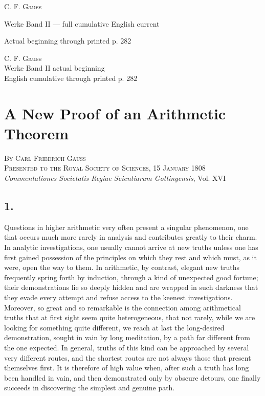 \documentclass[12pt]{article}
\begin{document}
\begin{center}
{\Large C. F. Gauss}\par
{\large Werke Band II — full cumulative English current}\par
{\large Actual beginning through printed p. 282}
\end{center}



\begin{center}
{\Large C. F. Gauss}\\[3pt]
{\large Werke Band II actual beginning}\\[3pt]
{\large English cumulative through printed p. 282}
\end{center}


\section*{A New Proof of an Arithmetic Theorem}

\begin{center}
\textsc{By Carl Friedrich Gauss}\\
\textsc{Presented to the Royal Society of Sciences, 15 January 1808}\\[3pt]
\emph{Commentationes Societatis Regiae Scientiarum Gottingensis}, Vol. XVI
\end{center}

\subsection*{1.}

Questions in higher arithmetic very often present a singular phenomenon, one that occurs much more rarely in analysis and contributes greatly to their charm. In analytic investigations, one usually cannot arrive at new truths unless one has first gained possession of the principles on which they rest and which must, as it were, open the way to them. In arithmetic, by contrast, elegant new truths frequently spring forth by induction, through a kind of unexpected good fortune; their demonstrations lie so deeply hidden and are wrapped in such darkness that they evade every attempt and refuse access to the keenest investigations. Moreover, so great and so remarkable is the connection among arithmetical truths that at first sight seem quite heterogeneous, that not rarely, while we are looking for something quite different, we reach at last the long-desired demonstration, sought in vain by long meditation, by a path far different from the one expected. In general, truths of this kind can be approached by several very different routes, and the shortest routes are not always those that present themselves first. It is therefore of high value when, after such a truth has long been handled in vain, and then demonstrated only by obscure detours, one finally succeeds in discovering the simplest and genuine path.
\end{document}
